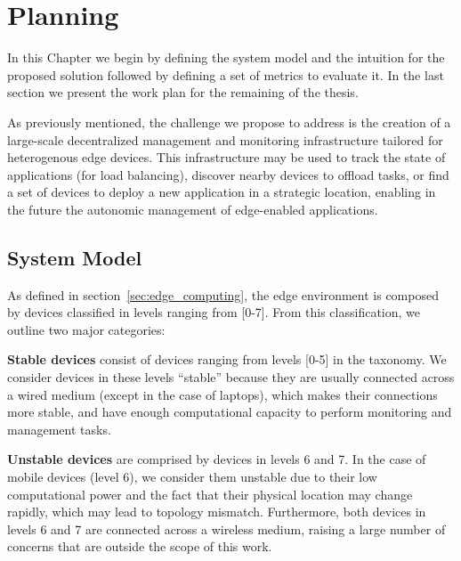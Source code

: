 \chapter{Planning} \label{cha:planning}

In this Chapter we begin by defining the system model and the intuition for the proposed solution followed by defining a set of metrics to evaluate it. In the last section we present the work plan for the remaining of the thesis. 

As previously mentioned, the challenge we propose to address is the creation of a large-scale decentralized management and monitoring infrastructure tailored for heterogenous edge devices. This infrastructure may be used to track the state of applications (for load balancing), discover nearby devices to offload tasks, or find a set of devices to deploy a new application in a strategic location, enabling in the future the autonomic management of edge-enabled applications.

\section{System Model}

As defined in section~\ref{sec:edge_computing}, the edge environment is composed by devices classified in levels ranging from [0-7]. From this classification, we outline two major categories:  

\textbf{Stable devices} consist of devices ranging from levels [0-5] in the taxonomy. We consider devices in these levels ``stable'' because they are usually connected across a wired medium (except in the case of laptops), which makes their connections more stable, and have enough computational capacity to perform monitoring and management tasks. 

\textbf{Unstable devices} are comprised by devices in levels 6 and 7. In the case of mobile devices (level 6), we consider them unstable due to their low computational power and the fact that their physical location may change rapidly, which may lead to topology mismatch. Furthermore, both devices in levels 6 and 7 are connected across a wireless medium, raising a large number of concerns that are outside the scope of this work.


